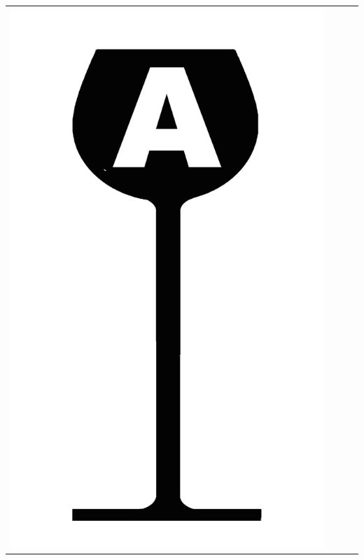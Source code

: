 {\renewcommand{\arraystretch}{1.1}
\begin{center}
\begin{tabular}{ c c c c}
\includegraphics[scale=0.021, trim= 0em -5em -5em -5em,]{Icones/icon_alsace_black.pdf}
&

\end{tabular}
\end{center}}
